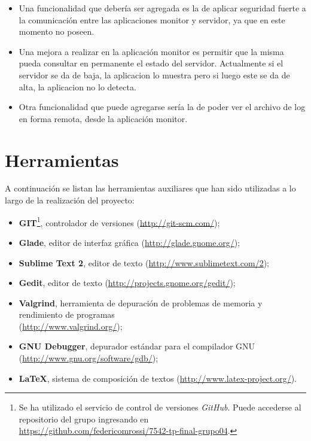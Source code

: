 \documentclass{article}
\begin{document}
\begin{itemize}
\item Una funcionalidad que debería ser agregada es la de aplicar seguridad fuerte a la comunicación entre las aplicaciones monitor y servidor, ya que en este momento no poseen.
\item Una mejora a realizar en la aplicación monitor es permitir que la misma pueda consultar en permanente el estado del servidor. Actualmente si el servidor se da de baja, la aplicacion lo muestra pero si luego este se da de alta, la aplicacion no lo detecta.
\item Otra funcionalidad que puede agregarse sería la de poder ver el archivo de log en forma remota, desde la aplicación monitor.
\end{itemize}

\bigskip




\section{Herramientas}

	A continuación se listan las herramientas auxiliares que han sido utilizadas a lo largo de la realización del proyecto:
	\smallskip

	\begin{itemize}
	\itemsep=8pt \topsep=0pt \partopsep=0pt \parskip=0pt \parsep=0pt

		\item \textbf{GIT}\footnote{Se ha utilizado el servicio de control de versiones \textit{GitHub}\cite{GITHUB}. Puede accederse al repositorio del grupo ingresando en\\ \url{https://github.com/federicomrossi/7542-tp-final-grupo04}.}, controlador de versiones (\url{http://git-scm.com/});

		\item \textbf{Glade}, editor de interfaz gráfica (\url{http://glade.gnome.org/});

		\item \textbf{Sublime Text 2}, editor de texto (\url{http://www.sublimetext.com/2});

		\item \textbf{Gedit}, editor de texto (\url{http://projects.gnome.org/gedit/});

		\item \textbf{Valgrind}, herramienta de depuración de problemas de memoria y rendimiento de programas \\(\url{http://www.valgrind.org/});

		\item \textbf{GNU Debugger}, depurador estándar para el compilador GNU (\url{http://www.gnu.org/software/gdb/});

		\item \textbf{LaTeX}, sistema de composición de textos (\url{http://www.latex-project.org/}).

	\end{itemize}	
\end{document}
